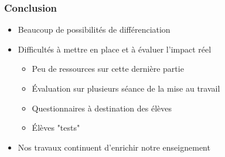 \begin{frame}
    \frametitle{Conclusion}
\begin{itemize}
 \item Beaucoup de possibilités de différenciation
 \item Difficultés à mettre en place et à évaluer l'impact réel
 \begin{itemize}
 	\item Peu de ressources sur cette dernière partie
 	\item \'{E}valuation sur plusieurs séance de la mise au travail
 	\item Questionnaires à destination des élèves
 	\item \'{E}lèves "tests"
 \end{itemize}
 \item Nos travaux continuent d'enrichir notre enseignement
\end{itemize}
\end{frame}
